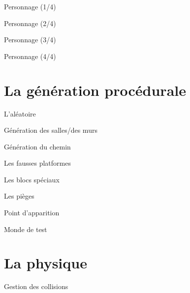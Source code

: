 \documentclass{beamer}
\begin{document}
{\begin{frame}{Personnage (1/4)}
\end{frame}

\begin{frame}{Personnage (2/4)}

\end{frame}

\begin{frame}{Personnage (3/4)}

\end{frame}

\begin{frame}{Personnage (4/4)}

\end{frame}

\section{La génération procédurale}
\begin{frame}{L'al\'eatoire}

\end{frame}

\begin{frame}{Génération des salles/des murs}

\end{frame}

\begin{frame}{Génération du chemin}

\end{frame}

\begin{frame}{Les fausses platformes}

\end{frame}

\begin{frame}{Les blocs spéciaux}

\end{frame}

\begin{frame}{Les pièges}

\end{frame}

\begin{frame}{Point d'apparition}

\end{frame}

\begin{frame}{Monde de test}

\end{frame}

\section{La physique}
\begin{frame}{Gestion des collisions}


\end{frame}}
\end{document}

